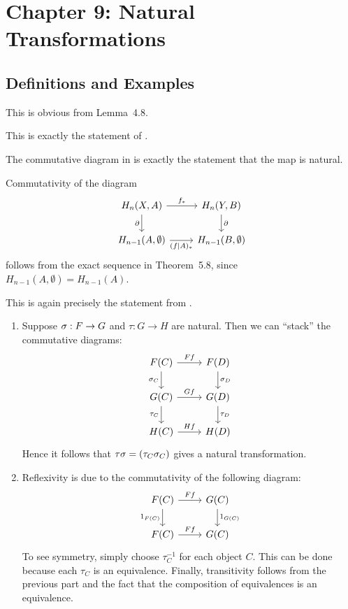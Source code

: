\documentclass[../../solutions.tex]{subfiles}
\begin{document}
\section{Chapter 9: Natural Transformations}
\subsection{Definitions and Examples}
\begin{exercise} \leavevmode
This is obvious from Lemma~4.8.
\end{exercise}

\begin{exercise} \leavevmode
This is exactly the statement of .
\end{exercise}

\begin{exercise} \leavevmode
The commutative diagram in  is exactly the statement that the map is natural.
\end{exercise}

\begin{exercise} \leavevmode
Commutativity of the diagram
\[
\begin{tikzcd}
H_n(X,A)\ar[r,"f_*"]\ar[d,"\partial",swap] & H_n(Y,B)\ar[d,"\partial"]\\
H_{n-1}(A,\emptyset)\ar[r,"(f|A)_*",swap] & H_{n-1}(B,\emptyset)
\end{tikzcd}
\]
follows from the exact sequence in Theorem~5.8, since $H_{n-1}(A,\emptyset)=H_{n-1}(A)$.
\end{exercise}

\begin{exercise} \leavevmode
This is again precisely the statement from .
\end{exercise}

\begin{exercise} \leavevmode
\begin{enumerate}
\item
Suppose $\sigma:F\to G$ and $\tau:G\to H$ are natural.
Then we can ``stack'' the commutative diagrams:
\[
\begin{tikzcd}
F(C)\ar[r,"Ff"]\ar[d,"\sig_C",swap] & F(D)\ar[d,"\sig_D"]\\
G(C)\ar[r,"Gf"]\ar[d,"\tau_C",swap] & G(D)\ar[d,"\tau_D"]\\
H(C)\ar[r,"Hf"] & H(D)
\end{tikzcd}
\]
Hence it follows that $\tau\sigma=(\tau_C\sigma_C)$ gives a natural transformation.

\item
Reflexivity is due to the commutativity of the following diagram:
\[
\begin{tikzcd}
F(C)\ar[r,"Ff"]\ar[d,"1_{F(C)}",swap] & G(C)\ar[d,"1_{G(C)}"]\\
F(C)\ar[r,"Ff"] & G(C)
\end{tikzcd}
\]
To see symmetry, simply choose $\tau_C^{-1}$ for each object $C$.
This can be done because each $\tau_C$ is an equivalence.
Finally, transitivity follows from the previous part and the fact that the composition of equivalences is an equivalence.
\end{enumerate}
\end{exercise}
\end{document}
